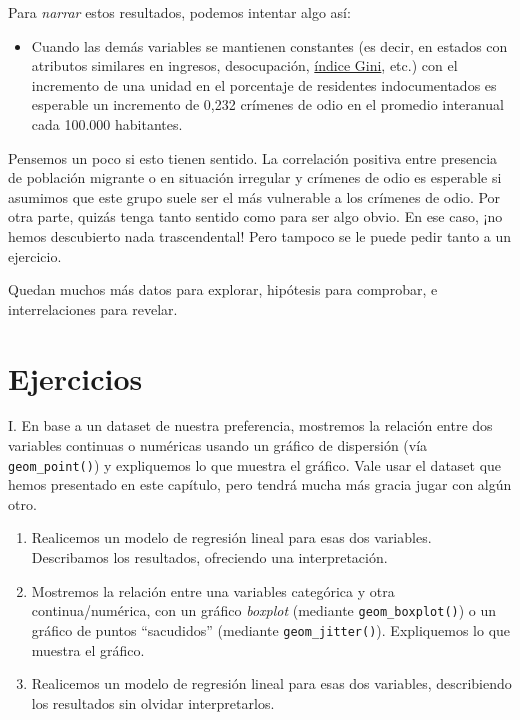 \documentclass[
]{book}
\providecommand{\tightlist}{%
  \setlength{\itemsep}{0pt}\setlength{\parskip}{0pt}}
\begin{document}
Para \emph{narrar} estos resultados, podemos intentar algo así:

\begin{itemize}
\tightlist
\item
  Cuando las demás variables se mantienen constantes (es decir, en estados con atributos similares en ingresos, desocupación, \href{https://es.wikipedia.org/wiki/Coeficiente_de_Gini}{índice Gini}, etc.) con el incremento de una unidad en el porcentaje de residentes indocumentados es esperable un incremento de 0,232 crímenes de odio en el promedio interanual cada 100.000 habitantes.
\end{itemize}

Pensemos un poco si esto tienen sentido. La correlación positiva entre presencia de población migrante o en situación irregular y crímenes de odio es esperable si asumimos que este grupo suele ser el más vulnerable a los crímenes de odio. Por otra parte, quizás tenga tanto sentido como para ser algo obvio. En ese caso, ¡no hemos descubierto nada trascendental! Pero tampoco se le puede pedir tanto a un ejercicio.

Quedan muchos más datos para explorar, hipótesis para comprobar, e interrelaciones para revelar.

\hypertarget{ejercicios-5}{%
\section{Ejercicios}\label{ejercicios-5}}

I. En base a un dataset de nuestra preferencia, mostremos la relación entre dos variables continuas o numéricas usando un gráfico de dispersión (vía \texttt{geom\_point()}) y expliquemos lo que muestra el gráfico. Vale usar el dataset que hemos presentado en este capítulo, pero tendrá mucha más gracia jugar con algún otro.

\begin{enumerate}
\def\labelenumi{\Roman{enumi}.}
\setcounter{enumi}{1}
\item
  Realicemos un modelo de regresión lineal para esas dos variables. Describamos los resultados, ofreciendo una interpretación.
\item
  Mostremos la relación entre una variables categórica y otra continua/numérica, con un gráfico \emph{boxplot} (mediante \texttt{geom\_boxplot()}) o un gráfico de puntos ``sacudidos'' (mediante \texttt{geom\_jitter()}). Expliquemos lo que muestra el gráfico.
\item
  Realicemos un modelo de regresión lineal para esas dos variables, describiendo los resultados sin olvidar interpretarlos.
\end{enumerate}
\end{document}
